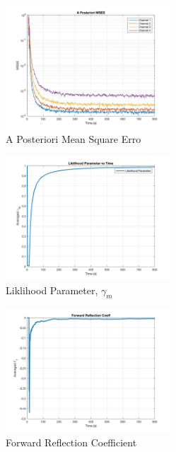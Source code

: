 \documentclass[journal]{IEEEtran}
\begin{document}
\begin{figure}[H]
  \centering
  \captionsetup{justification=centering,font = small}
  \includegraphics[width=0.55\textwidth, inner] {Plots/Project3_MSEE.jpg}
  \caption{A Posteriori Mean Square Erro}
    \label{fig:MSEEp}
\end{figure}

\begin{figure}[H]
  \centering
  \captionsetup{justification=centering,font = small}
  \includegraphics[width=0.55\textwidth, inner] {Plots/Project3_LIKLIHOOD.jpg}
  \caption{Liklihood Parameter, $\gamma_m$}
    \label{fig:liklihood}
\end{figure}

\begin{figure}[H]
  \centering
  \captionsetup{justification=centering,font = small}
  \includegraphics[width=0.55\textwidth, inner] {Plots/Project3_GAMMA_F.jpg}
  \caption{Forward Reflection Coefficient}
    \label{fig:gammaf}
\end{figure}
\end{document}
